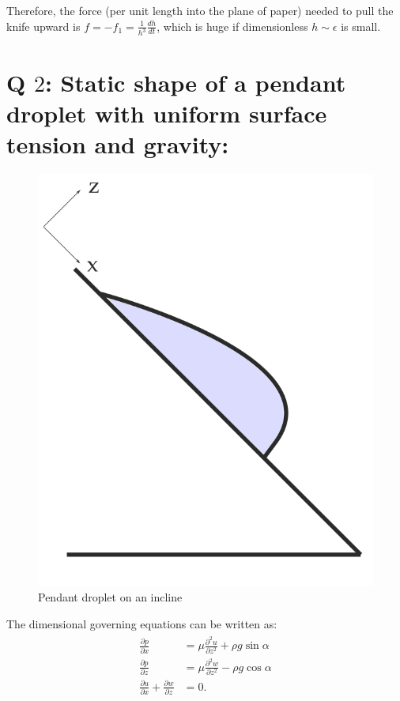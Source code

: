 \documentclass{article}
\begin{document}
Therefore, the force (per unit length into the plane of paper) needed to pull the knife upward is $f = -f_{1} = \frac{1}{h^{3}}\frac{dh}{dt}$, which is huge if dimensionless $h \sim \epsilon$ is small.

\section{Q $2$:  Static shape of a pendant droplet with uniform surface tension and gravity:}
\begin{figure}[H]
    \centering
    \includegraphics[scale = 0.2]{Figs/pendant_droplet_incline.png}
    \caption{Pendant droplet on an incline}
    \label{fig:pendant_droplet}
\end{figure}
The dimensional governing equations can be written as:
\begin{align}\label{eq:pendant_gov_eqns_dim}
 \begin{split}
  \frac{\partial p}{\partial x} &= \mu \frac{\partial^{2} u}{\partial z^{2}} + \rho g \sin{\alpha}\\
  \frac{\partial p}{\partial z} &= \mu \frac{\partial^{2} w}{\partial z^{2}} - \rho g \cos{\alpha}\\
  \frac{\partial u}{\partial x} + \frac{\partial w}{\partial z} &= 0.
 \end{split}
\end{align}
\end{document}
